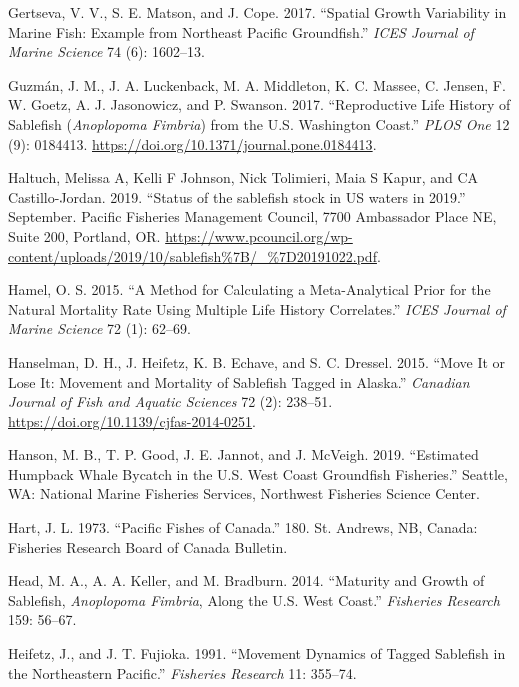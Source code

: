 \documentclass[11pt,
  english,
  a4paper,
]{article}
\newlength{\cslhangindent}
\newenvironment{cslreferences}%
  {\setlength{\parindent}{0pt}%
  \everypar{\setlength{\hangindent}{\cslhangindent}}\ignorespaces}%
  {\par}
\begin{document}
\begin{cslreferences}
\leavevmode\hypertarget{ref-gertseva2017icesjmsspatial}{}%
Gertseva, V. V., S. E. Matson, and J. Cope. 2017. ``Spatial Growth Variability in Marine Fish: Example from Northeast Pacific Groundfish.'' \emph{ICES Journal of Marine Science} 74 (6): 1602--13.

\leavevmode\hypertarget{ref-guzman2017}{}%
Guzmán, J. M., J. A. Luckenback, M. A. Middleton, K. C. Massee, C. Jensen, F. W. Goetz, A. J. Jasonowicz, and P. Swanson. 2017. ``Reproductive Life History of Sablefish (\emph{Anoplopoma Fimbria}) from the U.S. Washington Coast.'' \emph{PLOS One} 12 (9): 0184413. \url{https://doi.org/10.1371/journal.pone.0184413}.

\leavevmode\hypertarget{ref-Haltuch2019b}{}%
Haltuch, Melissa A, Kelli F Johnson, Nick Tolimieri, Maia S Kapur, and CA Castillo-Jordan. 2019. ``Status of the sablefish stock in US waters in 2019.'' September. Pacific Fisheries Management Council, 7700 Ambassador Place NE, Suite 200, Portland, OR. \url{https://www.pcouncil.org/wp-content/uploads/2019/10/sablefish\%7B/_\%7D20191022.pdf}.

\leavevmode\hypertarget{ref-hamel2015icesjms}{}%
Hamel, O. S. 2015. ``A Method for Calculating a Meta-Analytical Prior for the Natural Mortality Rate Using Multiple Life History Correlates.'' \emph{ICES Journal of Marine Science} 72 (1): 62--69.

\leavevmode\hypertarget{ref-hanselman2015cjfasmove}{}%
Hanselman, D. H., J. Heifetz, K. B. Echave, and S. C. Dressel. 2015. ``Move It or Lose It: Movement and Mortality of Sablefish Tagged in Alaska.'' \emph{Canadian Journal of Fish and Aquatic Sciences} 72 (2): 238--51. \url{https://doi.org/10.1139/cjfas-2014-0251}.

\leavevmode\hypertarget{ref-hanson2019}{}%
Hanson, M. B., T. P. Good, J. E. Jannot, and J. McVeigh. 2019. ``Estimated Humpback Whale Bycatch in the U.S. West Coast Groundfish Fisheries.'' Seattle, WA: National Marine Fisheries Services, Northwest Fisheries Science Center.

\leavevmode\hypertarget{ref-hart1973}{}%
Hart, J. L. 1973. ``Pacific Fishes of Canada.'' 180. St. Andrews, NB, Canada: Fisheries Research Board of Canada Bulletin.

\leavevmode\hypertarget{ref-head2014fishres}{}%
Head, M. A., A. A. Keller, and M. Bradburn. 2014. ``Maturity and Growth of Sablefish, \emph{Anoplopoma Fimbria}, Along the U.S. West Coast.'' \emph{Fisheries Research} 159: 56--67.

\leavevmode\hypertarget{ref-heifetz1991fishresmovement}{}%
Heifetz, J., and J. T. Fujioka. 1991. ``Movement Dynamics of Tagged Sablefish in the Northeastern Pacific.'' \emph{Fisheries Research} 11: 355--74.


\end{cslreferences}
\end{document}
